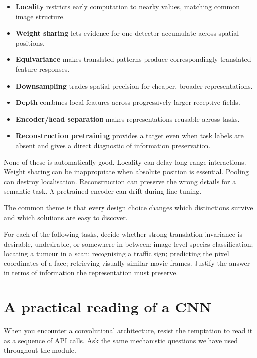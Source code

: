 \begin{itemize}[leftmargin=*]
  \item \textbf{Locality} restricts early computation to nearby values, matching common image structure.
  \item \textbf{Weight sharing} lets evidence for one detector accumulate across spatial positions.
  \item \textbf{Equivariance} makes translated patterns produce correspondingly translated feature responses.
  \item \textbf{Downsampling} trades spatial precision for cheaper, broader representations.
  \item \textbf{Depth} combines local features across progressively larger receptive fields.
  \item \textbf{Encoder/head separation} makes representations reusable across tasks.
  \item \textbf{Reconstruction pretraining} provides a target even when task labels are absent and gives a direct diagnostic of information preservation.
\end{itemize}

None of these is automatically good. Locality can delay long-range interactions. Weight sharing can be inappropriate when absolute position is essential. Pooling can destroy localisation. Reconstruction can preserve the wrong details for a semantic task. A pretrained encoder can drift during fine-tuning.

The common theme is that every design choice changes which distinctions survive and which solutions are easy to discover.

\begin{checkpointbox}
For each of the following tasks, decide whether strong translation invariance is desirable, undesirable, or somewhere in between: image-level species classification; locating a tumour in a scan; recognising a traffic sign; predicting the pixel coordinates of a face; retrieving visually similar movie frames. Justify the answer in terms of information the representation must preserve.
\end{checkpointbox}

\section{A practical reading of a CNN}

When you encounter a convolutional architecture, resist the temptation to read it as a sequence of API calls. Ask the same mechanistic questions we have used throughout the module.

